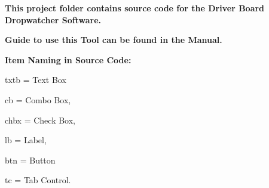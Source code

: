 {\bfseries{This project folder contains source code for the Driver Board Dropwatcher Software.}}

{\bfseries{Guide to use this Tool can be found in the Manual.}}

{\bfseries{Item Naming in Source Code\+:}}
\begin{DoxyItemize}
\item txtb = Text Box
\item cb = Combo Box,
\item chbx = Check Box,
\item lb = Label,
\item btn = Button
\item tc = Tab Control. 
\end{DoxyItemize}